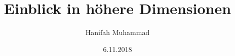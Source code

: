 








\begin{titlepage}

\titlehead{\centering}
\author{Hanifah Muhammad} 
\title{Einblick in höhere Dimensionen} 
\date{6.11.2018} 
\maketitle

\end{titlepage}




